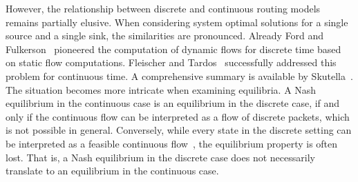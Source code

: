 
However, the relationship between discrete and continuous routing models remains partially elusive. When considering system optimal solutions for a single source and a single sink, the similarities are pronounced. Already Ford and Fulkerson~\cite{ford1958constructing} pioneered the computation of dynamic flows for discrete time based on static flow computations. Fleischer and Tardos~\cite{DBLP:journals/orl/FleischerT98} successfully addressed this problem for continuous time. A comprehensive summary is available by Skutella~\cite{DBLP:conf/bonnco/Skutella08}. The situation becomes more intricate when examining equilibria. A Nash equilibrium in the continuous case is an equilibrium in the discrete case, if and only if the continuous flow can be interpreted as a flow of discrete packets, which is not possible in general. Conversely, while every state in the discrete setting can be interpreted as a feasible continuous flow~\cite{DBLP:journals/orl/FleischerT98}, the equilibrium property is often lost. That is, a Nash equilibrium in the discrete case does not necessarily translate to an equilibrium in the continuous case.

